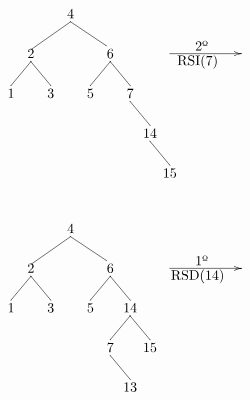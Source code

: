 \documentclass[10pt,a4paper,spanish]{report}
\begin{document}
\begin{minipage}{0.5\textwidth}
\[\begin{xy}
,(33,-8)*+=<10mm>[]\txt<2cm>{2º}
,(32,-12)*+=<20mm>[]\txt<2cm>{RSI(7)}
,(0,0)*+=<10mm>[]\txt<2cm>{4}
,(-10,-10)*+=<10mm>[]\txt<2cm>{2}
,(10,-10)*+=<10mm>[]\txt<2cm>{6}
,(-15,-20)*+=<10mm>[]\txt<2cm>{1}
,(-5,-20)*+=<10mm>[]\txt<2cm>{3}
,(5,-20)*+=<10mm>[]\txt<2cm>{5}
,(15,-20)*+=<10mm>[]\txt<2cm>{7}
,(20,-30)*+=<10mm>[]\txt<2cm>{14}
,(25,-40)*+=<10mm>[]\txt<2cm>{15}

\ar@{->} (25,-10);(43,-10)
\ar@{-} (0,-2);(-10,-9) %
\ar@{-} (0,-2);(9,-8) %
\ar@{-} (-10,-12);(-15,-18) %
\ar@{-} (10,-12);(5,-18) %
\ar@{-} (10,-12);(15,-18) %
\ar@{-} (-10,-12);(-5,-18) %
\ar@{-} (15,-22);(20,-28)
\ar@{-} (20,-32);(25,-38)
\end{xy}\]
\end{minipage}
\begin{minipage}{0.5\textwidth}
\[\begin{xy}
,(33,-8)*+=<10mm>[]\txt<2cm>{1º}
,(32,-12)*+=<20mm>[]\txt<2cm>{RSD(14)}
,(0,0)*+=<10mm>[]\txt<2cm>{4}
,(-10,-10)*+=<10mm>[]\txt<2cm>{2}
,(10,-10)*+=<10mm>[]\txt<2cm>{6}
,(-15,-20)*+=<10mm>[]\txt<2cm>{1}
,(-5,-20)*+=<10mm>[]\txt<2cm>{3}
,(5,-20)*+=<10mm>[]\txt<2cm>{5}
,(15,-20)*+=<10mm>[]\txt<2cm>{14}
,(10,-30)*+=<10mm>[]\txt<2cm>{7}
,(20,-30)*+=<10mm>[]\txt<2cm>{15}
,(15,-40)*+=<10mm>[]\txt<2cm>{13}

\ar@{->} (25,-10);(43,-10)
\ar@{-} (0,-2);(-10,-9) %
\ar@{-} (0,-2);(9,-8) %
\ar@{-} (-10,-12);(-15,-18) %
\ar@{-} (10,-12);(5,-18) %
\ar@{-} (10,-12);(15,-18) %
\ar@{-} (-10,-12);(-5,-18) %
\ar@{-} (15,-22);(10,-28) %
\ar@{-} (15,-22);(20,-28)
\ar@{-} (10,-32);(15,-38)
\end{xy}\]
\end{minipage}
\end{document}
